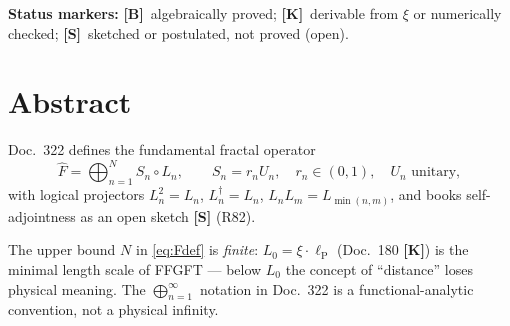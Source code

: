 
\providecommand{\K}{}\renewcommand{\K}{\textbf{[K]}}
\providecommand{\B}{}\renewcommand{\B}{\textbf{[B]}}
\renewcommand{\S}{\textbf{[S]}}
\providecommand{\lP}{}\renewcommand{\lP}{\ell_{\mathrm{P}}}
\providecommand{\Lnull}{}\renewcommand{\Lnull}{L_0}
\providecommand{\Fhat}{}\renewcommand{\Fhat}{\hat{F}}
\providecommand{\Hcal}{}\renewcommand{\Hcal}{\mathcal{H}}
\providecommand{\Dcal}{}\renewcommand{\Dcal}{\mathcal{D}}


\noindent\textbf{Status markers:} \B\ algebraically proved; \K\ derivable from $\xi$ or numerically checked; \S\ sketched or postulated, not proved (open).

\section*{Abstract}

Doc.~322 defines the fundamental fractal operator
\begin{equation}
  \Fhat = \bigoplus_{n=1}^{N} S_n \circ L_n,
  \qquad S_n = r_n U_n,\quad r_n \in (0,1),\quad U_n \text{ unitary},
  \label{eq:Fdef}
\end{equation}
with logical projectors $L_n^2 = L_n$, $L_n^\dagger = L_n$,
$L_nL_m = L_{\min(n,m)}$, and books self-adjointness as an open
sketch \textbf{[S]} (R82).

The upper bound $N$ in \eqref{eq:Fdef} is \emph{finite}:
$\Lnull = \xi\cdot\lP$ (Doc.~180 \K) is the minimal length scale
of FFGFT — below $\Lnull$ the concept of ``distance'' loses
physical meaning.
The $\bigoplus_{n=1}^\infty$ notation in Doc.~322 is a
functional-analytic convention, not a physical infinity.

